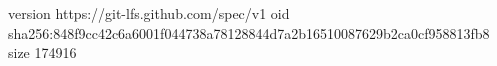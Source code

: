 version https://git-lfs.github.com/spec/v1
oid sha256:848f9cc42c6a6001f044738a78128844d7a2b16510087629b2ca0cf958813fb8
size 174916
